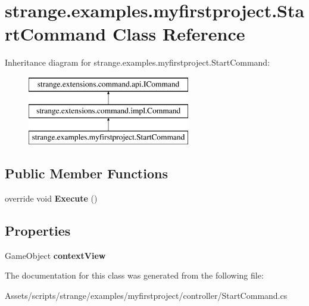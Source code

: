 \hypertarget{classstrange_1_1examples_1_1myfirstproject_1_1_start_command}{\section{strange.\-examples.\-myfirstproject.\-Start\-Command Class Reference}
\label{classstrange_1_1examples_1_1myfirstproject_1_1_start_command}
}
Inheritance diagram for strange.\-examples.\-myfirstproject.\-Start\-Command\-:\begin{figure}[H]
\begin{center}
\leavevmode
\includegraphics[height=3.000000cm]{classstrange_1_1examples_1_1myfirstproject_1_1_start_command}
\end{center}
\end{figure}
\subsection*{Public Member Functions}
\begin{DoxyCompactItemize}
\item 
\hypertarget{classstrange_1_1examples_1_1myfirstproject_1_1_start_command_a5a796225a96af7adf66a8d7e7c923fde}{override void {\bfseries Execute} ()}\label{classstrange_1_1examples_1_1myfirstproject_1_1_start_command_a5a796225a96af7adf66a8d7e7c923fde}

\end{DoxyCompactItemize}
\subsection*{Properties}
\begin{DoxyCompactItemize}
\item 
\hypertarget{classstrange_1_1examples_1_1myfirstproject_1_1_start_command_a44085199fe3298361d473af614f6b011}{Game\-Object {\bfseries context\-View}}\label{classstrange_1_1examples_1_1myfirstproject_1_1_start_command_a44085199fe3298361d473af614f6b011}

\end{DoxyCompactItemize}


The documentation for this class was generated from the following file\-:\begin{DoxyCompactItemize}
\item 
Assets/scripts/strange/examples/myfirstproject/controller/Start\-Command.\-cs\end{DoxyCompactItemize}
